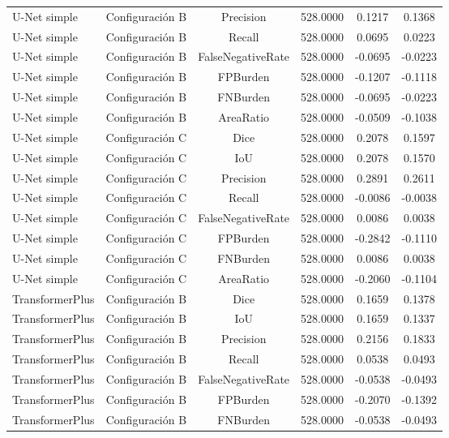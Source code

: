 \begin{table}[H]
\begin{tabular}{lccccc}
        U-Net simple & Configuración B & Precision & 528.0000 & 0.1217 & 0.1368 \\
        U-Net simple & Configuración B & Recall & 528.0000 & 0.0695 & 0.0223 \\
        U-Net simple & Configuración B & FalseNegativeRate & 528.0000 & -0.0695 & -0.0223 \\
        U-Net simple & Configuración B & FPBurden & 528.0000 & -0.1207 & -0.1118 \\
        U-Net simple & Configuración B & FNBurden & 528.0000 & -0.0695 & -0.0223 \\
        U-Net simple & Configuración B & AreaRatio & 528.0000 & -0.0509 & -0.1038 \\
        U-Net simple & Configuración C & Dice & 528.0000 & 0.2078 & 0.1597 \\
        U-Net simple & Configuración C & IoU & 528.0000 & 0.2078 & 0.1570 \\
        U-Net simple & Configuración C & Precision & 528.0000 & 0.2891 & 0.2611 \\
        U-Net simple & Configuración C & Recall & 528.0000 & -0.0086 & -0.0038 \\
        U-Net simple & Configuración C & FalseNegativeRate & 528.0000 & 0.0086 & 0.0038 \\
        U-Net simple & Configuración C & FPBurden & 528.0000 & -0.2842 & -0.1110 \\
        U-Net simple & Configuración C & FNBurden & 528.0000 & 0.0086 & 0.0038 \\
        U-Net simple & Configuración C & AreaRatio & 528.0000 & -0.2060 & -0.1104 \\
        TransformerPlus & Configuración B & Dice & 528.0000 & 0.1659 & 0.1378 \\
        TransformerPlus & Configuración B & IoU & 528.0000 & 0.1659 & 0.1337 \\
        TransformerPlus & Configuración B & Precision & 528.0000 & 0.2156 & 0.1833 \\
        TransformerPlus & Configuración B & Recall & 528.0000 & 0.0538 & 0.0493 \\
        TransformerPlus & Configuración B & FalseNegativeRate & 528.0000 & -0.0538 & -0.0493 \\
        TransformerPlus & Configuración B & FPBurden & 528.0000 & -0.2070 & -0.1392 \\
        TransformerPlus & Configuración B & FNBurden & 528.0000 & -0.0538 & -0.0493 \\

\end{tabular}
\end{table}
